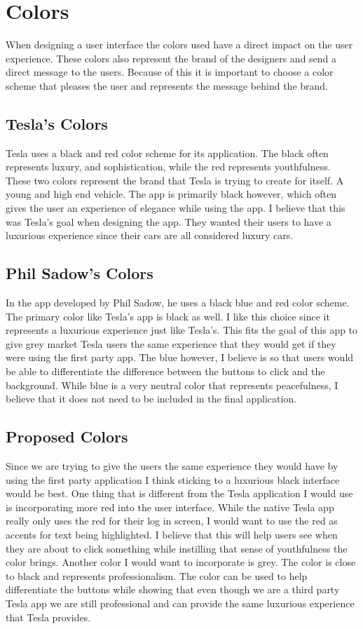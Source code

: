 \documentclass[draftclsnofoot, onecolumn, compsoc, 10pt]{IEEEtran}
\begin{document}
\section{Colors}
When designing a user interface the colors used have a direct impact on the user experience. These colors also represent the brand of the designers and send a direct message to the users. Because of this it is important to choose a color scheme that pleases the user and represents the message behind the brand.
\subsection{Tesla's Colors}
Tesla uses a black and red color scheme for its application. The black often represents luxury, and sophistication, while the red represents youthfulness. These two colors represent the brand that Tesla is trying to create for itself. A young and high end vehicle. The app is primarily black however, which often gives the user an experience of elegance while using the app. I believe that this was Tesla’s goal when designing the app. They wanted their users to have a luxurious experience since their cars are all considered luxury cars\cite{color}. 
\subsection{Phil Sadow's Colors}
In the app developed by Phil Sadow, he uses a black blue and red color scheme. The primary color like Tesla’s app is black as well. I like this choice since it represents a luxurious experience just like Tesla’s. This fits the goal of this app to give grey market Tesla users the same experience that they would get if they were using the first party app. The blue however, I believe is so that users would be able to differentiate the difference between the buttons to click and the background. While blue is a very neutral color that represents peacefulness, I believe that it does not need to be included in the final application\cite{color}. 

\subsection{Proposed Colors}
Since we are trying to give the users the same experience they would have by using the first party application I think sticking to a luxurious black interface would be best. One thing that is different from the Tesla application I would use is incorporating more red into the user interface. While the native Tesla app really only uses the red for their log in screen, I would want to use the red as accents for text being highlighted. I believe that this will help users see when they are about to click something while instilling that sense of youthfulness the color brings. Another color I would want to incorporate is grey. The color is close to black and represents professionalism. The color can be used to help differentiate the buttons while showing that even though we are a third party Tesla app we are still professional and can provide the same luxurious experience that Tesla provides\cite{color}. 
\end{document}
